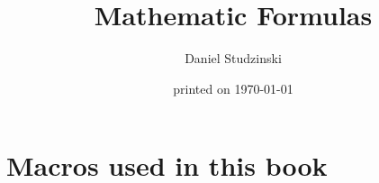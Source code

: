 \documentclass[a4paper,10pt,twoside,titlepage]{article}
\begin{document}
\newsavebox{\mySd}

\title{Mathematic Formulas}
\date{printed on \today}
\author{Daniel Studzinski}
\maketitle
\section*{Macros used in this book}
   \label{DSmyMacro}\clearpage
\tableofcontents                  \cleardoublepage














\printindex
\end{document}
